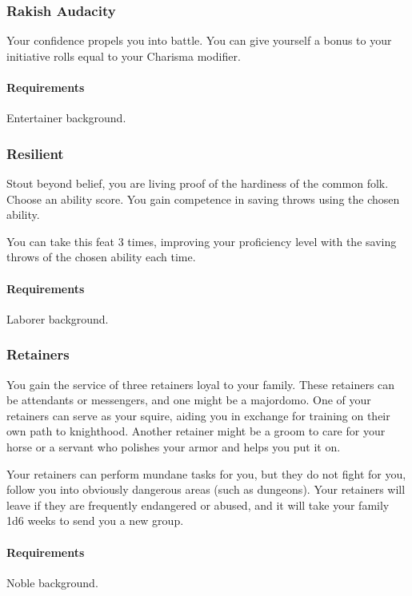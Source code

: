 \subsubsection{Rakish Audacity} \label{feat::rakishaudacity}
    Your confidence propels you into battle.
    You can give yourself a bonus to your initiative rolls equal to your Charisma modifier.
    \paragraph{Requirements} Entertainer background.
\subsubsection{Resilient} \label{feat::resilient}
    Stout beyond belief, you are living proof of the hardiness of the common folk.
    Choose an ability score.
    You gain competence in saving throws using the chosen ability.

    You can take this feat 3 times, improving your proficiency level with the saving throws of the chosen ability each time.
    \paragraph{Requirements} Laborer background.
\subsubsection{Retainers} \label{feat::retainers}
    You gain the service of three retainers loyal to your family.
    These retainers can be attendants or messengers, and one might be a majordomo.
    One of your retainers can serve as your squire, aiding you in exchange for training on their own path to knighthood.
    Another retainer might be a groom to care for your horse or a servant who polishes your armor and helps you put it on.

    Your retainers can perform mundane tasks for you, but they do not fight for you, follow you into obviously dangerous areas (such as dungeons).
    Your retainers will leave if they are frequently endangered or abused, and it will take your family 1d6 weeks to send you a new group.
    \paragraph{Requirements} Noble background.
